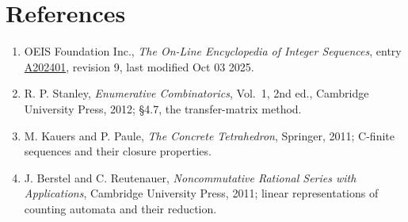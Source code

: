 \documentclass[11pt]{article}
\theoremstyle{definition}
\begin{document}
\section{References}

\begin{enumerate}

\item OEIS Foundation Inc., \emph{The On-Line Encyclopedia of Integer Sequences}, entry \href{https://oeis.org/A202401}{A202401}, revision 9, last modified Oct 03 2025.

\item R. P. Stanley, \emph{Enumerative Combinatorics}, Vol.~1, 2nd ed., Cambridge University Press, 2012; \S4.7, the transfer-matrix method.

\item M. Kauers and P. Paule, \emph{The Concrete Tetrahedron}, Springer, 2011; C-finite sequences and their closure properties.

\item J. Berstel and C. Reutenauer, \emph{Noncommutative Rational Series with Applications}, Cambridge University Press, 2011; linear representations of counting automata and their reduction.

\end{enumerate}
\end{document}
